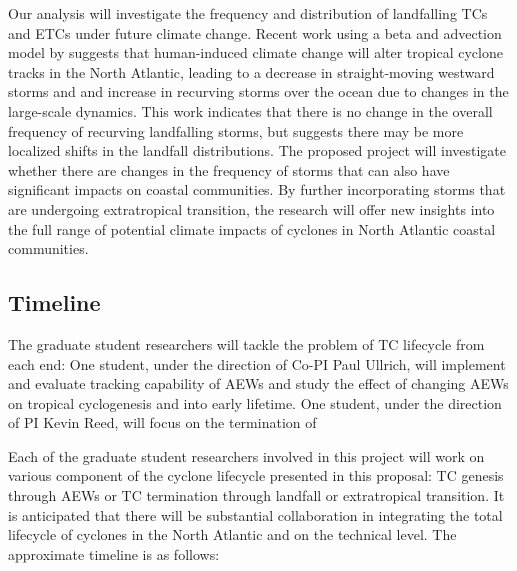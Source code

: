 \documentclass[11pt]{article}
\begin{document}
Our analysis will investigate the frequency and distribution of landfalling TCs and ETCs under future climate change. Recent work using a beta and advection model by \citet{Colbert2013} suggests that human-induced climate change will alter tropical cyclone tracks in the North Atlantic, leading to a decrease in straight-moving westward storms and and increase in recurving storms over the ocean due to changes in the large-scale dynamics.  This work indicates that there is no change in the overall frequency of recurving landfalling storms, but suggests there may be more localized shifts in the landfall distributions. The proposed project will investigate whether there are changes in the frequency of storms that can also have significant impacts on coastal communities.  By further incorporating storms that are undergoing extratropical transition, the research will offer new insights into the full range of potential climate impacts of cyclones in North Atlantic coastal communities.

\subsection{Timeline} \label{sec:Timeline}
The graduate student researchers will tackle the problem of TC lifecycle from each end:  One student, under the direction of Co-PI Paul Ullrich, will implement and evaluate tracking capability of AEWs and study the effect of changing AEWs on tropical cyclogenesis and into early lifetime.  One student, under the direction of PI Kevin Reed, will focus on the termination of 

Each of the graduate student researchers involved in this project will work on various component of the cyclone lifecycle presented in this proposal:   TC genesis through AEWs or TC termination through landfall or extratropical transition.  It is anticipated that there will be substantial collaboration in integrating the total lifecycle of cyclones in the North Atlantic and on the technical level.  The approximate timeline is as follows:
\end{document}
